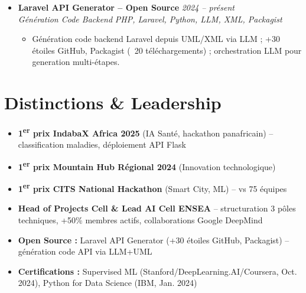 \documentclass[a4paper,11pt]{article}
\begin{document}
\begin{itemize}[leftmargin=*, label={-}]
    \item \textbf{Laravel API Generator -- Open Source} \hfill \textit{2024 -- présent} \\
    \textit{Génération Code Backend} \hfill \textit{PHP, Laravel, Python, LLM, XML, Packagist}
    \vspace{-2pt}
    \begin{itemize}[leftmargin=0.4cm, nosep, label=\tiny$\bullet$]
        \item \small{Génération code backend Laravel depuis UML/XML via LLM ; +30 étoiles GitHub, Packagist (~20 téléchargements) ; orchestration LLM pour generation multi-étapes.}
    \end{itemize}
    \vspace{3pt}

\end{itemize}

\section{Distinctions \& Leadership}
\begin{itemize}[leftmargin=*, label=\tiny$\bullet$, nosep]
    \item \small{\textbf{1\textsuperscript{er} prix IndabaX Africa 2025} (IA Santé, hackathon panafricain) -- classification maladies, déploiement API Flask}
    \item \small{\textbf{1\textsuperscript{er} prix Mountain Hub Régional 2024} (Innovation technologique)}
    \item \small{\textbf{1\textsuperscript{er} prix CITS National Hackathon} (Smart City, ML) -- vs 75 équipes}
    \item \small{\textbf{Head of Projects Cell \& Lead AI Cell ENSEA} -- structuration 3 pôles techniques, +50\% membres actifs, collaborations Google DeepMind}
    \item \small{\textbf{Open Source :} Laravel API Generator (+30 étoiles GitHub, Packagist) -- génération code API via LLM+UML}
    \item \small{\textbf{Certifications :} Supervised ML (Stanford/DeepLearning.AI/Coursera, Oct. 2024), Python for Data Science (IBM, Jan. 2024)}
\end{itemize}
\end{document}

